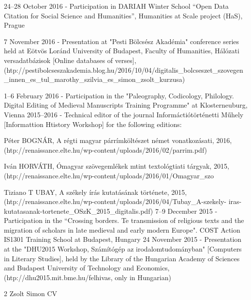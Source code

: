 \documentclass{article}
\begin{document}
      24–28 October 2016 - Participation in DARIAH Winter School “Open Data
       Citation for Social Science and Humanities”, Humanities at Scale project (HaS),
       Prague

      7 November 2016 - Presentation at "Pesti Bölcsész Akadémia" conference series
       held at Eötvös Loránd University of Budapest, Faculty of Humanities, Hálózati
       versadatbázisok [Online databases of verses],
       (htp://pestibolcseszakademia.blog.hu/2016/10/04/digitalis\_bolcseszet\_szovegen
       \_innen\_es\_tul\_marothy\_szilvia\_es\_simon\_zsolt\_kurzusa)

      1–6 February 2016 - Participation in the "Paleography, Codicology, Philology.
       Digital Editing of Medieval Manuscripts Training Programme" at
       Klosterneuburg, Vienna
      2015–2016 - Technical editor of the journal Informáctiótörténetti Műhely
       [Informattion Htistory Workshop] for the following editions:

        Péter BOGNÁR, A régti magyar párrímköltészet német vonatkozásati, 2016,
         (htp://renaissance.elte.hu/wp-content/uploads/2016/02/parrim.pdf)

        Iván HORVÁTH, Ómagyar szövegemlékek mtint textológtiati tárgyak, 2015,
         (htp://renaissance.elte.hu/wp-content/uploads/2016/01/Omagyar\_szo%

        Tiziano T UBAY, A székely írás kutatásának története, 2015,
         (htp://renaissance.elte.hu/wp-content/uploads/2016/04/Tubay\_A-szekely-
         iras-kutatasanak-tortenete\_OSzK\_2015\_digitalis.pdf)
      7–9 December 2015 - Participation in the “Crossing borders. Te transmission
       of religious texts and the migration of scholars in late medieval and early
       modern Europe". COST Action IS1301 Training School at Budapest, Hungary
      24 November 2015 - Presentation at the "DHU2015 Workshop, Számítógép az
       irodalomtudományban" [Computers in Literary Studies], held by the Library of
       the Hungarian Academy of Sciences and Budapest University of Technology
       and Economics, (htp://dhu2015.mit.bme.hu/felhivas, only in Hungarian)



                                           2
Zsolt Simon                                                                                 CV
\end{document}
